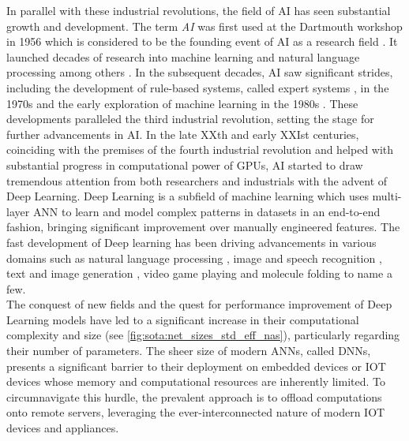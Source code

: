 In parallel with these industrial revolutions, the field of \ac{AI} has seen
substantial growth and development. The term \emph{\acl{AI}} was first used at
the Dartmouth workshop in 1956 which is considered to be the founding event of
\ac{AI} as a research field \cite{dartmouth1956}. It launched decades of
research into machine learning and natural language processing among others
\cite{nilsson1998artificial}. In the subsequent decades, \ac{AI} saw significant
strides, including the development of rule-based systems, called expert systems
\cite{giarratano1994expert}, in the 1970s and the early exploration of machine
learning in the 1980s \cite{rumelhart1986learning}. These developments
paralleled the third industrial revolution, setting the stage for further
advancements in \ac{AI}. In the late XXth and early XXIst centuries, coinciding
with the premises of the fourth industrial revolution and helped with
substantial progress in computational power of \acp{GPU}, \ac{AI} started to
draw tremendous attention from both researchers and industrials with the advent
of Deep Learning. Deep Learning is a subfield of machine learning which uses
multi-layer \ac{ANN} to learn and model complex patterns in datasets in an
end-to-end fashion, bringing significant improvement over manually engineered
features. The fast development of Deep learning has been driving advancements in
various domains such as natural language processing
\cite{DBLP:conf/emnlp/BudzianowskiV19,DBLP:conf/naacl/DevlinCLT19,DBLP:conf/nips/VaswaniSPUJGKP17},
image and speech recognition
\cite{DBLP:conf/nips/KrizhevskySH12,DBLP:journals/corr/SimonyanZ14a,DBLP:conf/cvpr/HeZRS16,DBLP:journals/corr/HannunCCCDEPSSCN14,DBLP:conf/icassp/ChanJLV16,DBLP:conf/icml/AmodeiABCCCCCCD16},
text and image generation
\cite{goodfellow2020generative,karras2019style,DBLP:conf/emnlp/BudzianowskiV19},
video game playing \cite{silver2016mastering,silver2018general} and molecule
folding \cite{jumper2021highly} to name a few.\\


The conquest of new fields and the quest for performance improvement of Deep
Learning models have led to a significant increase in their computational
complexity and size (see \cref{fig:sota:net_sizes_std_eff_nas}), particularly
regarding their number of parameters. The sheer size of modern \acp{ANN}, called
\acp{DNN}, presents a significant barrier to their deployment on embedded
devices or \ac{IOT} devices whose memory and computational resources are
inherently limited. To circumnavigate this hurdle, the prevalent approach is to
offload computations onto remote servers, leveraging the ever-interconnected
nature of modern \ac{IOT} devices and appliances.\\

